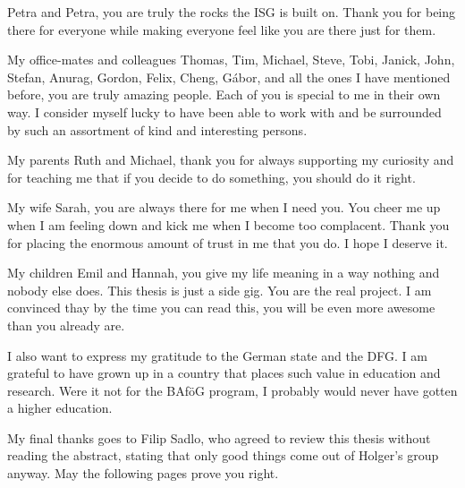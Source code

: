 %
Petra and Petra, you are truly the rocks the ISG is built on.
%
Thank you for being there for everyone while making everyone feel like you are
there just for them.
%

%
My office-mates and colleagues Thomas, Tim, Michael, Steve, Tobi, Janick, John,
Stefan, Anurag, Gordon, Felix, Cheng, G\'abor, and all the ones I have mentioned
before, you are truly amazing people.
%
Each of you is special to me in their own way.
%
I consider myself lucky to have been able to work with and be surrounded by such
an assortment of kind and interesting persons.
%

%
My parents Ruth and Michael, thank you for always supporting my curiosity and
for teaching me that if you decide to do something, you should do it right.
%

%
My wife Sarah, you are always there for me when I need you.
%
You cheer me up when I am feeling down and kick me when I become too complacent.
%
Thank you for placing the enormous amount of trust in me that you do.
%
I hope I deserve it.
%

%
My children Emil and Hannah, you give my life meaning in a way nothing and
nobody else does.
%
This thesis is just a side gig.
%
You are the real project.
%
I am convinced thay by the time you can read this, you will be even more awesome
than you already are.
%

%
I also want to express my gratitude to the German state and the DFG.
%
I am grateful to have grown up in a country that places such value in education
and research.
%
Were it not for the BAf\"oG program, I probably would never have gotten a higher
education.
%

%
My final thanks goes to Filip Sadlo, who agreed to review this thesis without
reading the abstract, stating that only good things come out of Holger's group
anyway.
%
May the following pages prove you right.
%
%
%
%
%
%
%
%
%
%
%